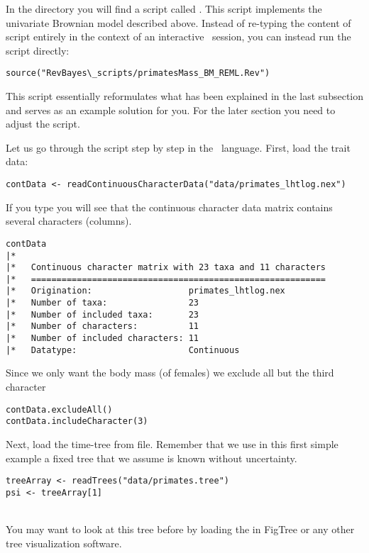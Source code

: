 In the directory  you will find a script called .
This script implements the univariate Brownian model described above. Instead of re-typing the content of script entirely in the context of an interactive \RevBayes~session, you can instead run the script directly:
{\tt \small \begin{snugshade*}
\begin{lstlisting}
source("RevBayes\_scripts/primatesMass_BM_REML.Rev")
\end{lstlisting}
\end{snugshade*}}
This script essentially reformulates what has been explained in the last subsection and serves as an example solution for you. For the later section you need to adjust the script.

Let us go through the script step by step in the \Rev~language.
First, load the trait data:
{\tt \small \begin{snugshade*}
\begin{lstlisting}
contData <- readContinuousCharacterData("data/primates_lhtlog.nex")
\end{lstlisting}
\end{snugshade*}}
If you type you will see that the continuous character data matrix contains several characters (columns). 
{\tt \small \begin{snugshade*}
\begin{lstlisting}
contData
|*
|*   Continuous character matrix with 23 taxa and 11 characters
|*   ==========================================================
|*   Origination:                   primates_lhtlog.nex
|*   Number of taxa:                23
|*   Number of included taxa:       23
|*   Number of characters:          11
|*   Number of included characters: 11
|*   Datatype:                      Continuous
\end{lstlisting}
\end{snugshade*}}
Since we only want the body mass (of females) we exclude all but the third character
{\tt \small \begin{snugshade*}
\begin{lstlisting}
contData.excludeAll()
contData.includeCharacter(3) 
\end{lstlisting}
\end{snugshade*}}

Next, load the time-tree from file. Remember that we use in this first simple example a fixed tree that we assume is known without uncertainty.
{\tt \small \begin{snugshade*}
\begin{lstlisting}
treeArray <- readTrees("data/primates.tree")
psi <- treeArray[1]
\end{lstlisting}
\end{snugshade*}}
\noindent \\ \impmark You may want to look at this tree before by loading the  in FigTree or any other tree visualization software.

